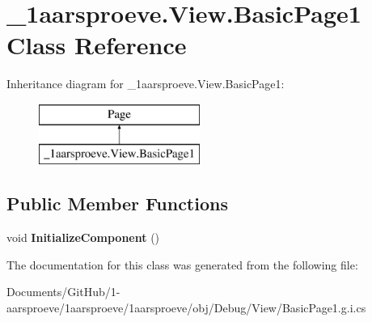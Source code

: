 \hypertarget{class__1aarsproeve_1_1_view_1_1_basic_page1}{}\section{\+\_\+1aarsproeve.\+View.\+Basic\+Page1 Class Reference}
\label{class__1aarsproeve_1_1_view_1_1_basic_page1}
Inheritance diagram for \+\_\+1aarsproeve.\+View.\+Basic\+Page1\+:\begin{figure}[H]
\begin{center}
\leavevmode
\includegraphics[height=2.000000cm]{class__1aarsproeve_1_1_view_1_1_basic_page1}
\end{center}
\end{figure}
\subsection*{Public Member Functions}
\begin{DoxyCompactItemize}
\item 
\hypertarget{class__1aarsproeve_1_1_view_1_1_basic_page1_a3ab3823b20bab45db7e1c30759ad354e}{}void {\bfseries Initialize\+Component} ()\label{class__1aarsproeve_1_1_view_1_1_basic_page1_a3ab3823b20bab45db7e1c30759ad354e}

\end{DoxyCompactItemize}


The documentation for this class was generated from the following file\+:\begin{DoxyCompactItemize}
\item 
Documents/\+Git\+Hub/1-\/aarsproeve/1aarsproeve/1aarsproeve/obj/\+Debug/\+View/Basic\+Page1.\+g.\+i.\+cs\end{DoxyCompactItemize}
